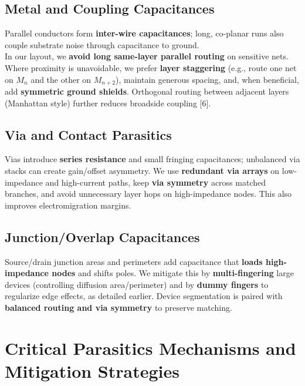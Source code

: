 \documentclass[
  11pt,
  a4paper,
  oneside]{scrbook}
\begin{document}
\subsection{Metal and Coupling
Capacitances}\label{metal-and-coupling-capacitances}

Parallel conductors form \textbf{inter-wire capacitances}; long,
co-planar runs also couple substrate noise through capacitance to
ground.\\
In our layout, we \textbf{avoid long same-layer parallel routing} on
sensitive nets. Where proximity is unavoidable, we prefer \textbf{layer
staggering} (e.g., route one net on \(M_n\) and the other on
\(M_{n+2}\)), maintain generous spacing, and, when beneficial, add
\textbf{symmetric ground shields}. Orthogonal routing between adjacent
layers (Manhattan style) further reduces broadside coupling {[}6{]}.

\subsection{Via and Contact
Parasitics}\label{via-and-contact-parasitics}

Vias introduce \textbf{series resistance} and small fringing
capacitances; unbalanced via stacks can create gain/offset asymmetry. We
use \textbf{redundant via arrays} on low-impedance and high-current
paths, keep \textbf{via symmetry} across matched branches, and avoid
unnecessary layer hops on high-impedance nodes. This also improves
electromigration margins.

\subsection{Junction/Overlap
Capacitances}\label{junctionoverlap-capacitances}

Source/drain junction areas and perimeters add capacitance that
\textbf{loads high-impedance nodes} and shifts poles. We mitigate this
by \textbf{multi-fingering} large devices (controlling diffusion
area/perimeter) and by \textbf{dummy fingers} to regularize edge
effects, as detailed earlier. Device segmentation is paired with
\textbf{balanced routing and via symmetry} to preserve matching.

\section{Critical Parasitics Mechanisms and Mitigation
Strategies}\label{critical-parasitics-mechanisms-and-mitigation-strategies}
\end{document}
